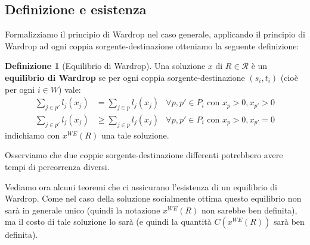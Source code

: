 \documentclass[a4paper]{article}
\theoremstyle{plain}
\theoremstyle{definition}
\newtheorem{mydef}[myteo]{Definizione}
\theoremstyle{remark}
\newcommand{\pa}[1]{\left(#1\right)}
\begin{document}
\subsection{Definizione e esistenza}
\label{sec:wardrop-definizione}

Formalizziamo il principio di Wardrop nel caso generale, applicando il
principio di Wardrop ad ogni coppia sorgente-destinazione otteniamo la
seguente definizione:
\begin{mydef}[Equilibrio di Wardrop]
  \label{def:wardrop}
  Una soluzione $x$ di $R\in \mathcal{R}$ è un \textbf{equilibrio di
    Wardrop} se per ogni coppia sorgente-destinazione $(s_i,t_i)$
  (cioè per ogni $i\in W$) vale:
  \begin{align*}
    \sum _{j\in p'} l_j(x_j) &= \sum _{j\in p} l_j(x_j) & \forall
                                                           p,p'\in P_i \text{ con } x_p >0, x_{p'} >0 \\
    \sum _{j\in p'} l_j(x_j) &\ge \sum _{j\in p} l_j(x_j) & \forall
                                                             p,p'\in P_i \text{ con } x_p >0, x_{p'} =0 
  \end{align*}
  indichiamo con $x^{WE}(R)$ una tale soluzione.
\end{mydef}

Osserviamo che due coppie sorgente-destinazione differenti potrebbero
avere tempi di percorrenza diversi.

Vediamo ora alcuni teoremi che ci assicurano l'esistenza di un
equilibrio di Wardrop. Come nel caso della soluzione socialmente
ottima questo equilibrio non sarà in generale unico (quindi la
notazione $x^{WE}(R)$ non sarebbe ben definita), ma il costo di tale
soluzione lo sarà (e quindi la quantità $C\pa{x^{WE}\pa{R}}$ sarà ben
definita).
\end{document}
